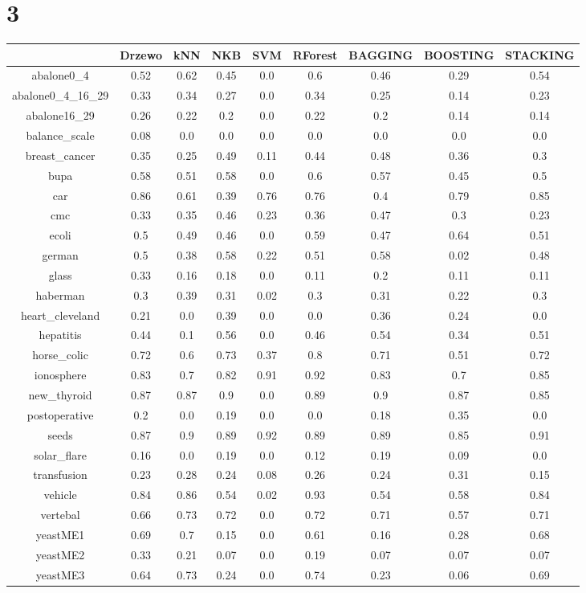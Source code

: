 \documentclass{article}%
\begin{document}
%
\section*{3}%
\begin{tabular}{|c|c|c|c|c|c|c|c|c|}%
\hline%
&Drzewo&kNN&NKB&SVM&RForest&BAGGING&BOOSTING&STACKING\\%
\hline%
abalone0\_4&0.52&0.62&0.45&0.0&0.6&0.46&0.29&0.54\\%
\hline%
abalone0\_4\_16\_29&0.33&0.34&0.27&0.0&0.34&0.25&0.14&0.23\\%
\hline%
abalone16\_29&0.26&0.22&0.2&0.0&0.22&0.2&0.14&0.14\\%
\hline%
balance\_scale&0.08&0.0&0.0&0.0&0.0&0.0&0.0&0.0\\%
\hline%
breast\_cancer&0.35&0.25&0.49&0.11&0.44&0.48&0.36&0.3\\%
\hline%
bupa&0.58&0.51&0.58&0.0&0.6&0.57&0.45&0.5\\%
\hline%
car&0.86&0.61&0.39&0.76&0.76&0.4&0.79&0.85\\%
\hline%
cmc&0.33&0.35&0.46&0.23&0.36&0.47&0.3&0.23\\%
\hline%
ecoli&0.5&0.49&0.46&0.0&0.59&0.47&0.64&0.51\\%
\hline%
german&0.5&0.38&0.58&0.22&0.51&0.58&0.02&0.48\\%
\hline%
glass&0.33&0.16&0.18&0.0&0.11&0.2&0.11&0.11\\%
\hline%
haberman&0.3&0.39&0.31&0.02&0.3&0.31&0.22&0.3\\%
\hline%
heart\_cleveland&0.21&0.0&0.39&0.0&0.0&0.36&0.24&0.0\\%
\hline%
hepatitis&0.44&0.1&0.56&0.0&0.46&0.54&0.34&0.51\\%
\hline%
horse\_colic&0.72&0.6&0.73&0.37&0.8&0.71&0.51&0.72\\%
\hline%
ionosphere&0.83&0.7&0.82&0.91&0.92&0.83&0.7&0.85\\%
\hline%
new\_thyroid&0.87&0.87&0.9&0.0&0.89&0.9&0.87&0.85\\%
\hline%
postoperative&0.2&0.0&0.19&0.0&0.0&0.18&0.35&0.0\\%
\hline%
seeds&0.87&0.9&0.89&0.92&0.89&0.89&0.85&0.91\\%
\hline%
solar\_flare&0.16&0.0&0.19&0.0&0.12&0.19&0.09&0.0\\%
\hline%
transfusion&0.23&0.28&0.24&0.08&0.26&0.24&0.31&0.15\\%
\hline%
vehicle&0.84&0.86&0.54&0.02&0.93&0.54&0.58&0.84\\%
\hline%
vertebal&0.66&0.73&0.72&0.0&0.72&0.71&0.57&0.71\\%
\hline%
yeastME1&0.69&0.7&0.15&0.0&0.61&0.16&0.28&0.68\\%
\hline%
yeastME2&0.33&0.21&0.07&0.0&0.19&0.07&0.07&0.07\\%
\hline%
yeastME3&0.64&0.73&0.24&0.0&0.74&0.23&0.06&0.69\\%
\hline%
\end{tabular}

%
\end{document}
